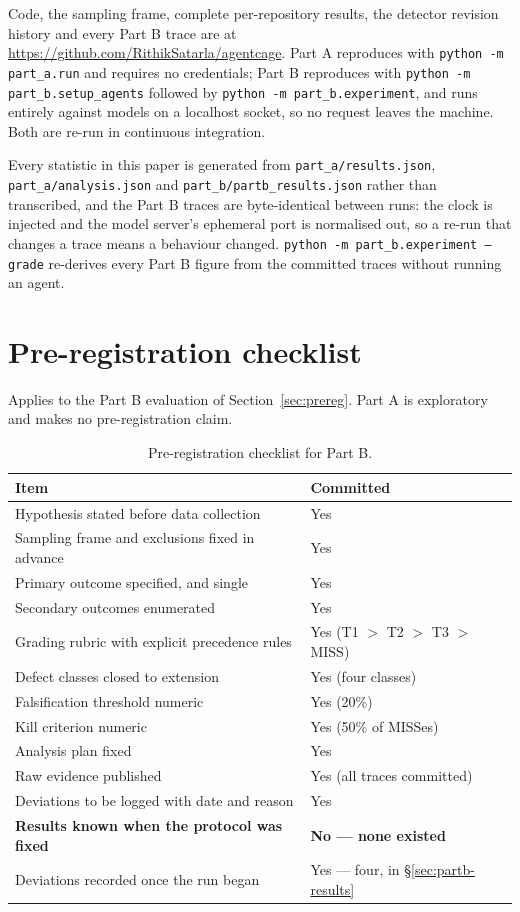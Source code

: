 \documentclass[11pt]{article}
\begin{document}
Code, the sampling frame, complete per-repository results, the detector revision history
and every Part B trace are at \url{https://github.com/RithikSatarla/agentcage}. Part A
reproduces with \texttt{python -m part\_a.run} and requires no credentials; Part B
reproduces with \texttt{python -m part\_b.setup\_agents} followed by
\texttt{python -m part\_b.experiment}, and runs entirely against models on a localhost
socket, so no request leaves the machine. Both are re-run in continuous integration.

Every statistic in this paper is generated from \texttt{part\_a/results.json},
\texttt{part\_a/analysis.json} and \texttt{part\_b/partb\_results.json} rather than
transcribed, and the Part B traces are byte-identical between runs: the clock is injected
and the model server's ephemeral port is normalised out, so a re-run that changes a trace
means a behaviour changed. \texttt{python -m part\_b.experiment --grade} re-derives every
Part B figure from the committed traces without running an agent.

\appendix

\section{Pre-registration checklist}
\label{app:checklist}

Applies to the Part B evaluation of Section~\ref{sec:prereg}. Part A is exploratory and
makes no pre-registration claim.

\begin{table}[h]
\centering
\small
\begin{tabular}{p{}p{}}
\toprule
Item & Committed \\
\midrule
Hypothesis stated before data collection & Yes \\
Sampling frame and exclusions fixed in advance & Yes \\
Primary outcome specified, and single & Yes \\
Secondary outcomes enumerated & Yes \\
Grading rubric with explicit precedence rules & Yes (T1 $>$ T2 $>$ T3 $>$ MISS) \\
Defect classes closed to extension & Yes (four classes) \\
Falsification threshold numeric & Yes (20\%) \\
Kill criterion numeric & Yes (50\% of MISSes) \\
Analysis plan fixed & Yes \\
Raw evidence published & Yes (all traces committed) \\
Deviations to be logged with date and reason & Yes \\
\textbf{Results known when the protocol was fixed} & \textbf{No --- none existed} \\
Deviations recorded once the run began & Yes --- four, in \S\ref{sec:partb-results} \\
\bottomrule
\end{tabular}
\caption{Pre-registration checklist for Part B.}
\end{table}
\end{document}
